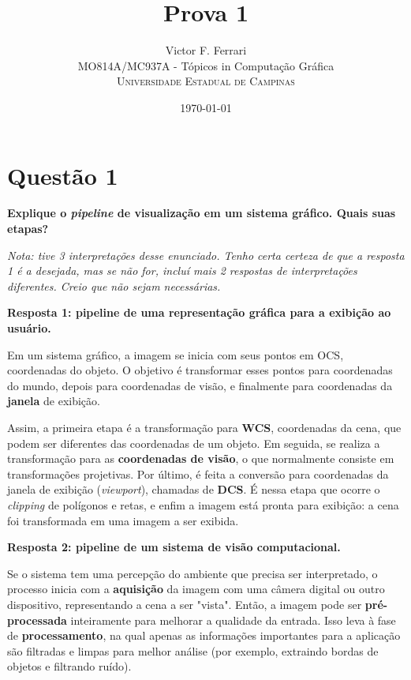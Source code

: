 \documentclass[12pt]{article}
\title{Prova 1} %
\author{Victor F. Ferrari\\ %
MO814A/MC937A - Tópicos in Computação Gráfica\\ %
\textsc{Universidade Estadual de Campinas}
}
\date{\today} %
\begin{document}
\setlength{\droptitle}{-5em}    
\maketitle


\section*{Questão 1}
{\bfseries Explique o \textit{pipeline} de visualização em um sistema gráfico. Quais suas etapas?}

\textit{Nota: tive 3 interpretações desse enunciado. Tenho certa certeza de que a resposta 1 é a desejada, mas se não for, incluí mais 2 respostas de interpretações diferentes. Creio que não sejam necessárias.}

\textbf{Resposta 1: pipeline de uma representação gráfica para a exibição ao usuário.}

Em um sistema gráfico, a imagem se inicia com seus pontos em OCS, coordenadas do objeto. O objetivo é transformar esses pontos para coordenadas do mundo, depois para coordenadas de visão, e finalmente para coordenadas da \textbf{janela} de exibição.

Assim, a primeira etapa é a transformação para \textbf{WCS}, coordenadas da cena, que podem ser diferentes das coordenadas de um objeto. Em seguida, se realiza a transformação para as \textbf{coordenadas de visão}, o que normalmente consiste em transformações projetivas. Por último, é feita a conversão para coordenadas da janela de exibição (\textit{viewport}), chamadas de \textbf{DCS}. É nessa etapa que ocorre o \textit{clipping} de polígonos e retas, e enfim a imagem está pronta para exibição: a cena foi transformada em uma imagem a ser exibida.

\bigskip
\textbf{Resposta 2: pipeline de um sistema de visão computacional.}

Se o sistema tem uma percepção do ambiente que precisa ser interpretado, o processo inicia com a \textbf{aquisição} da imagem com uma câmera digital ou outro dispositivo, representando a cena a ser "vista". Então, a imagem pode ser \textbf{pré-processada} inteiramente para melhorar a qualidade da entrada. Isso leva à fase de \textbf{processamento}, na qual apenas as informações importantes para a aplicação são filtradas e limpas para melhor análise (por exemplo, extraindo bordas de objetos e filtrando ruído).
\end{document}
